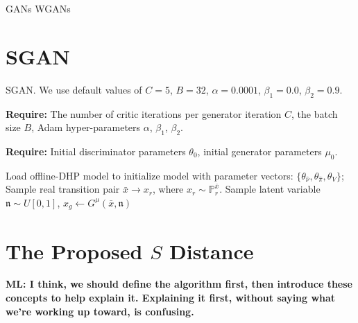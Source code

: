 \documentclass[letterpaper]{article} %
\begin{document}
GANs WGANs

\section{SGAN}

\begin{algorithm}
    \caption{SGAN. We use default values of $C=5$, $B=32$, $\alpha=0.0001$, $\beta_1=0.0$, $\beta_2=0.9$.}
    \label{sgan}

    \textbf{Require:} The number of critic iterations per generator iteration $C$, the batch size $B$, Adam hyper-parameters $\alpha$, $\beta_1$, $\beta_2$.

    \textbf{Require:} Initial discriminator parameters $\theta_0$, initial generator parameters $\mu_0$.
\begin{algorithmic}[1]
    \STATE Load offline-DHP model to initialize model with parameter vectors: $\{  \theta_{\hat{\nu}}, \theta_{\hat{\pi}}, \theta_{V} \}$;
                \STATE Sample real transition pair $\bar{x}\rightarrow x_r$, where $x_r \sim \mathbb{P}_r^{\bar{x}}$.
                \STATE Sample latent variable $\mathfrak{n} \sim U[0,1]$,
                \STATE $x_g\leftarrow G^{\mu}(\bar{x},\mathfrak{n})$
            \ENDFOR
        \ENDFOR
    \ENDWHILE
\end{algorithmic}
\end{algorithm}

\section{The Proposed $S$ Distance}

{\bf ML: I think, we should define the algorithm first, then introduce these concepts to help explain it. Explaining it first, without saying what we're working up toward, is confusing.}
\end{document}

